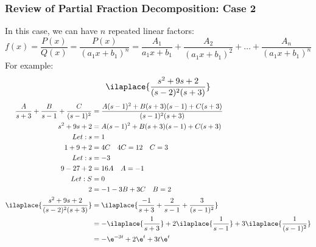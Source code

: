 \documentclass{math}
\begin{document}
\subsubsection*{Review of Partial Fraction Decomposition: Case 2}
In this case, we can have \( n \) repeated linear factors:
\[ f(x) = \frac{P(x)}{Q(x)} = \frac{P(x)}{(a_1x+b_1)^n} = \frac{A_1}{a_1x+b_1}+
  \frac{A_2}{(a_1x+b_1)^2}+\dots+\frac{A_n}{(a_1x+b_1)^n} \]
For example:
\[ \ilaplace{\frac{s^2+9s+2}{(s-2)^2(s+3)}} \]
\begin{align*}
  \frac{A}{s+3}+\frac{B}{s-1}+\frac{C}{(s-1)^2}
    &= \frac{A(s-1)^2+B(s+3)(s-1)+C(s+3)}{(s-1)^2(s+3)} \\
  s^2+9s+2 &= A(s-1)^2+B(s+3)(s-1)+C(s+3) \\
  Let: s &= 1 \\
  1+9+2 &= 4C \quad 4C = 12 \quad C = 3 \\
  Let: s &= -3 \\
  9-27+2 &= 16A \quad A = -1 \\
  Let: S &= 0 \\
  2 &= -1-3B+3C \quad B = 2 \\
  \ilaplace{\frac{s^2+9s+2}{(s-2)^2(s+3)}} &= \ilaplace{\frac{-1}{s+3}+
    \frac{2}{s-1}+\frac{3}{(s-1)^2}} \\
  &= -\ilaplace{\frac{1}{s+3}}+2\ilaplace{\frac{1}{s-1}}+
    3\ilaplace{\frac{1}{(s-1)^2}} \\
  &= -\e^{-3t}+2\e^t+3t\e^t
\end{align*}
\end{document}
